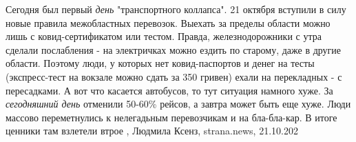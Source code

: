 Сегодня был первый \emph{день} "транспортного коллапса". 21 октября вступили в силу
новые правила межобластных перевозок. Выехать за пределы области можно лишь с
ковид-сертификатом или тестом. Правда, железнодорожники с утра сделали
послабления - на электричках можно ездить по старому, даже в другие области.
Поэтому люди, у которых нет ковид-паспортов и денег на тесты (экспресс-тест на
вокзале можно сдать за 350 гривен) ехали на перекладных - с пересадками.  А вот
что касается автобусов, то тут ситуация намного хуже. За \emph{сегодняшний день}
отменили 50-60\% рейсов, а завтра может быть еще хуже. Люди массово
переметнулись к нелегадьным перевозчикам и на бла-бла-кар. В итоге ценники там
взлетели втрое
, Людмила Ксенз, strana.news, 21.10.202
